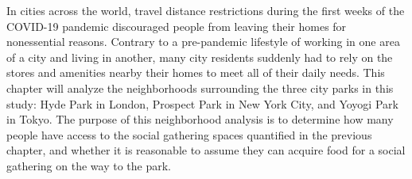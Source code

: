 \noindent In cities across the world, travel distance restrictions during the first weeks of the COVID-19 pandemic discouraged people from leaving their homes for nonessential reasons. Contrary to a pre-pandemic lifestyle of working in one area of a city and living in another, many city residents suddenly had to rely on the stores and amenities nearby their homes to meet all of their daily needs. This chapter will analyze the neighborhoods surrounding the three city parks in this study: Hyde Park in London, Prospect Park in New York City, and Yoyogi Park in Tokyo. The purpose of this neighborhood analysis is to determine how many people have access to the social gathering spaces quantified in the previous chapter, and whether it is reasonable to assume they can acquire food for a social gathering on the way to the park. 

